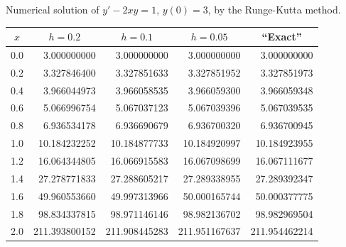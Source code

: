 \begin{examplesolution}
\begin{newtable}
  \label{table:3.3.3} Numerical solution of $y'-2xy=1$, $y(0)=3$, by the Runge-Kutta method.
  \begin{center}
    \begin{tabular}{|c|r|r|r|r|}
      \hline
      \multicolumn{1}{|c|}{$x$} & \multicolumn{1}{|c|}{$h=0.2$} & \multicolumn{1}{|c|}{$h=0.1$} & \multicolumn{1}{|c|}{$h=0.05$} & \multicolumn{1}{|c|}{``Exact''} \\
      \hline
      0.0                       & 3.000000000                   & 3.000000000                   & 3.000000000                    & 3.000000000                     \\
      0.2                       & 3.327846400                   & 3.327851633                   & 3.327851952                    & 3.327851973                     \\
      0.4                       & 3.966044973                   & 3.966058535                   & 3.966059300                    & 3.966059348                     \\
      0.6                       & 5.066996754                   & 5.067037123                   & 5.067039396                    & 5.067039535                     \\
      0.8                       & 6.936534178                   & 6.936690679                   & 6.936700320                    & 6.936700945                     \\
      1.0                       & 10.184232252                  & 10.184877733                  & 10.184920997                   & 10.184923955                    \\
      1.2                       & 16.064344805                  & 16.066915583                  & 16.067098699                   & 16.067111677                    \\
      1.4                       & 27.278771833                  & 27.288605217                  & 27.289338955                   & 27.289392347                    \\
      1.6                       & 49.960553660                  & 49.997313966                  & 50.000165744                   & 50.000377775                    \\
      1.8                       & 98.834337815                  & 98.971146146                  & 98.982136702                   & 98.982969504                    \\
      2.0                       & 211.393800152                 & 211.908445283                 & 211.951167637                  & 211.954462214                   \\
      \hline
    \end{tabular}
  \end{center}
\end{newtable}


\end{examplesolution}
